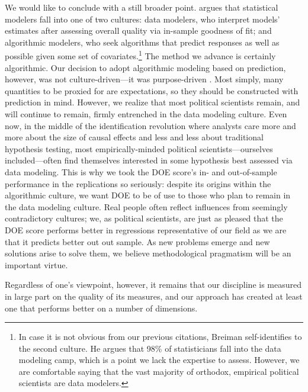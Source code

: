 We would like to conclude with a still broader point.  \citet{Breiman:2001fd} argues that statistical modelers fall into one of two cultures:  data modelers, who interpret models' estimates after assessing overall quality via in-sample goodness of fit; and algorithmic modelers, who seek algorithms that predict responses as well as possible given some set of covariates.\footnote{In case it is not obvious from our previous citations, Breiman self-identifies to the second culture.  He argues that 98\% of statisticians fall into the data modeling camp, which is a point we lack the expertise to assess.  However, we are comfortable saying that the vast majority of orthodox, empirical political scientists are data modelers.}  The method we advance is certainly algorithmic.  Our decision to adopt algorithmic modeling based on prediction, however, was not culture-driven---it was purpose-driven \citep{clarke2012}.  Most simply, many quantities to be proxied for are expectations, so they should be constructed with prediction in mind.  However, we realize that most political scientists remain, and will continue to remain, firmly entrenched in the data modeling culture.  Even now, in the middle of the identification revolution where analysts care more and more about the size of causal effects and less and less about traditional hypothesis testing, most empirically-minded political scientists---ourselves included---often find themselves interested in some hypothesis best assessed via data modeling.  This is why we took the DOE score's in- and out-of-sample performance in the replications so seriously:  despite its origins within the algorithmic culture, we want DOE to be of use to those who plan to remain in the data modeling culture.  Real people often reflect influences from seemingly contradictory cultures; we, as political scientists, are just as pleased that the DOE score performs better in regressions representative of our field as we are that it predicts better out out sample.  As new problems emerge and new solutions arise to solve them, we believe methodological pragmatism will be an important virtue.

Regardless of one's viewpoint, however, it remains that our discipline is measured in large part on the quality of its measures, and our approach has created at least one that performs better on a number of dimensions.


